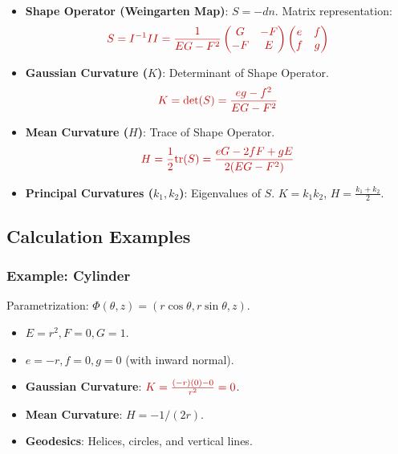 \documentclass[a4paper,12pt]{article}
\newcommand{\key}[1]{\textcolor{keywordcolor}{\textbf{#1}}}
\newcommand{\formula}[1]{\textcolor{formulacolor}{#1}}
\begin{document}
\begin{itemize}
    \item \key{Shape Operator (Weingarten Map)}: $S = -dn$. Matrix representation:
    \begin{equation}
        \formula{S = I^{-1} II = \frac{1}{EG-F^2} \begin{pmatrix} G & -F \\ -F & E \end{pmatrix} \begin{pmatrix} e & f \\ f & g \end{pmatrix}}
    \end{equation}
    \item \key{Gaussian Curvature ($K$)}: Determinant of Shape Operator.
    \begin{equation}
        \formula{K = \det(S) = \frac{eg - f^2}{EG - F^2}}
    \end{equation}
    \item \key{Mean Curvature ($H$)}: Trace of Shape Operator.
    \begin{equation}
        \formula{H = \frac{1}{2}\text{tr}(S) = \frac{eG - 2fF + gE}{2(EG - F^2)}}
    \end{equation}
    \item \key{Principal Curvatures ($k_1, k_2$)}: Eigenvalues of $S$. $K = k_1 k_2$, $H = \frac{k_1 + k_2}{2}$.
\end{itemize}

\subsection{Calculation Examples}

\subsubsection{Example: Cylinder}
Parametrization: $\Phi(\theta, z) = (r \cos \theta, r \sin \theta, z)$.
\begin{itemize}
    \item $E = r^2, F = 0, G = 1$.
    \item $e = -r, f = 0, g = 0$ (with inward normal).
    \item \textbf{Gaussian Curvature}: $\formula{K = \frac{(-r)(0) - 0}{r^2} = 0}$.
    \item \textbf{Mean Curvature}: $H = -1/(2r)$.
    \item \textbf{Geodesics}: Helices, circles, and vertical lines.
\end{itemize}
\end{document}
